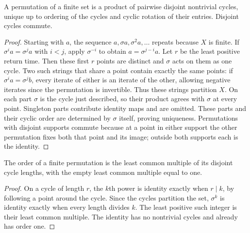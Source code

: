 \begin{theorem}\label{thm:disjoint-cycles}
A permutation of a finite set is a product of pairwise disjoint nontrivial cycles, unique up to ordering of the cycles and cyclic rotation of their entries. Disjoint cycles commute.
\end{theorem}
\begin{proof}
Starting with $a$, the sequence $a,\sigma a,\sigma^2a,\ldots$ repeats because $X$ is finite. If $\sigma^i a=\sigma^j a$ with $i<j$, apply $\sigma^{-i}$ to obtain $a=\sigma^{j-i}a$. Let $r$ be the least positive return time. Then these first $r$ points are distinct and $\sigma$ acts on them as one cycle. Two such strings that share a point contain exactly the same points: if $\sigma^i a=\sigma^j b$, every iterate of either is an iterate of the other, allowing negative iterates since the permutation is invertible. Thus these strings partition $X$. On each part $\sigma$ is the cycle just described, so their product agrees with $\sigma$ at every point. Singleton parts contribute identity maps and are omitted. These parts and their cyclic order are determined by $\sigma$ itself, proving uniqueness. Permutations with disjoint supports commute because at a point in either support the other permutation fixes both that point and its image; outside both supports each is the identity.
\end{proof}

\begin{proposition}\label{prop:permutation-order}
The order of a finite permutation is the least common multiple of its disjoint cycle lengths, with the empty least common multiple equal to one.
\end{proposition}
\begin{proof}
On a cycle of length $r$, the $k$th power is identity exactly when $r\mid k$, by following a point around the cycle. Since the cycles partition the set, $\sigma^k$ is identity exactly when every length divides $k$. The least positive such integer is their least common multiple. The identity has no nontrivial cycles and already has order one.
\end{proof}

